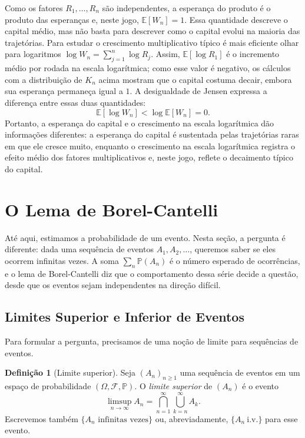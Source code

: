 \documentclass[12pt,portuguese]{article}
\theoremstyle{definition}
\newtheorem{definition}[definition]{Definição}
\theoremstyle{plainexercise}
\theoremstyle{starredexercise}
\theoremstyle{definition}
\begin{document}
Como os fatores $R_1,\ldots,R_n$ são independentes, a esperança do produto é
o produto das esperanças e, neste jogo, $\mathbb{E}[W_n]=1$. Essa quantidade
descreve o capital médio, mas não basta para descrever como o capital evolui
na maioria das trajetórias. Para estudar o crescimento multiplicativo típico
é mais eficiente olhar para logaritmos  $\log W_n=\sum_{j=1}^n\log R_j$. Assim,
$\mathbb{E}[\log R_1]$ é o incremento médio por rodada na escala logarítmica;
como esse valor é negativo, os cálculos com a distribuição de $K_n$ acima
mostram que o capital costuma decair, embora sua esperança permaneça igual a
$1$. A desigualdade de Jensen expressa a diferença entre essas duas
quantidades:
\[
\mathbb{E}[\log W_n]<\log\mathbb{E}[W_n]=0.
\]
Portanto, a esperança do capital e o crescimento na escala logarítmica dão
informações diferentes: a esperança do capital é sustentada pelas trajetórias
raras em que ele cresce muito, enquanto o crescimento na escala logarítmica
registra o efeito médio dos fatores multiplicativos e, neste jogo, reflete o
decaimento típico do capital.

\section{O Lema de Borel-Cantelli}\label{sec:borel-cantelli}

Até aqui, estimamos a probabilidade de um evento. Nesta seção, a pergunta é
diferente: dada uma sequência de eventos $A_1,A_2,\ldots$, queremos saber se
eles ocorrem infinitas vezes. A soma $\sum_n\mathbb{P}(A_n)$ é o número
esperado de ocorrências, e o lema de Borel-Cantelli diz que o comportamento
dessa série decide a questão, desde que os eventos sejam independentes na
direção difícil.

\subsection{Limites Superior e Inferior de Eventos}\label{subsec:limsup}

Para formular a pergunta, precisamos de uma noção de limite para sequências de
eventos.

\begin{definition}[Limite superior]\label{def:limsup}
Seja $(A_n)_{n\geqslant1}$ uma sequência de eventos em um espaço de
probabilidade $(\Omega,\mathcal{F},\mathbb{P})$. O \emph{limite superior} de
$(A_n)$ é o evento
\[
\limsup_{n\to\infty}A_n
=
\bigcap_{n=1}^{\infty}\bigcup_{k=n}^{\infty}A_k.
\]
Escrevemos também $\{A_n\text{ infinitas vezes}\}$ ou, abreviadamente,
$\{A_n\ \text{i.v.}\}$ para esse evento.
\end{definition}
\end{document}
